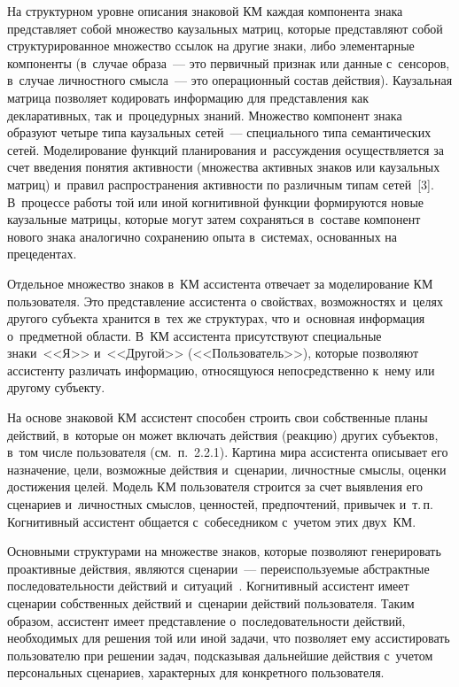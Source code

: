 \begin{multicols}{2}
  На структурном уровне описания знаковой КМ каждая компонента 
знака представляет собой множество каузальных матриц, которые 
представляют собой структурированное множество ссылок на другие знаки, 
либо элементарные компоненты (в~случае образа~--- это первичный признак 
или данные с~сенсоров, в~случае личностного смысла~--- это операционный 
состав действия). Каузальная матрица позволяет кодировать информацию для 
представления как декларативных, так и~процедурных знаний. Множество 
компонент знака образуют четыре типа каузальных сетей~--- специального 
типа семантических сетей. Моделирование функций планирования 
и~рассуждения осуществляется за счет введения понятия ак\-тив\-ности (множества 
активных знаков или каузальных матриц) и~правил распространения 
активности по различным типам сетей~[3]. В~процессе работы той или иной 
когнитивной функции формируются новые каузальные матрицы, которые 
могут затем сохраняться в~составе компонент нового знака аналогично 
сохранению опыта в~системах, основанных на прецедентах.
  
  Отдельное множество знаков в~КМ ассистента отвечает за моделирование 
КМ пользователя. Это представление ассистента о свойствах, 
возможностях и~целях другого субъекта хранится в~тех же структурах, что 
и~основная информация о~предметной об\-ласти. В~КМ ассистента 
присутствуют специальные знаки~<<Я>> и~<<Другой>> (<<Пользователь>>), 
которые позволяют ассистенту различать информацию, относящуюся 
непосредственно к~нему или другому субъекту.
  
  На основе знаковой КМ ассистент способен строить свои 
собственные планы действий, в~которые он может включать действия 
(реакцию) других субъектов, в~том числе пользователя (см.\ п.~2.2.1). Картина мира 
ассистента описывает его назначение, цели, возможные действия и~сценарии, 
личностные смыслы, оценки достижения целей. Модель КМ пользователя 
строится за счет выявления его сценариев и~личностных смыслов, ценностей, 
предпочтений, привычек и~т.\,п. Когнитивный ассистент общается 
с~собеседником с~учетом этих двух~КМ.
  
  Основными структурами на множестве знаков, которые позволяют 
генерировать проактивные действия, являются сценарии~--- переиспользуемые 
абстрактные последовательности действий и~ситуаций~\cite{2-sm}. 
Когнитивный ассистент имеет сценарии собственных действий и~сценарии 
действий пользователя. Таким образом, ассистент имеет представление 
о~последовательности действий, необходимых для решения той или иной 
задачи, что позволяет ему ассистировать пользователю при решении задач, 
подсказывая дальнейшие действия с~учетом персональных сценариев, 
характерных для конкретного пользователя.
  

\end{multicols}
